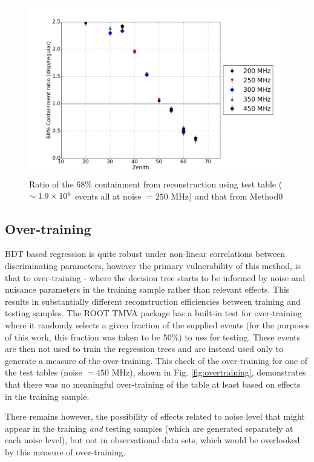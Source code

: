 \documentclass[main.tex]{subfiles}
\begin{document}
\begin{figure}[htbp]
  \centering
  \includegraphics[width=0.8\linewidth]{images/disp_250_ratio_xzen}
  \caption[Test \disp table reconstruction (noise = $250$ MHz)]{Ratio of the 68\% containment from reconstruction using test \disp table ($\sim 1.9\times 10^{6}$ events all at noise $= 250$ MHz) and that from Method0}
  \label{fig:disp_ratio_250}
\end{figure}

\subsection{Over-training}
BDT based regression is quite robust under non-linear correlations between discriminating parameters, however the primary vulnerability of this method, is that  to over-training - where the decision tree starts to be informed by noise and nuisance parameters in the training sample rather than relevant effects. This results in substantially different reconstruction efficiencies between training and testing samples. The ROOT TMVA package has a built-in test for over-training where it randomly selects a given fraction of the supplied events (for the purposes of this work, this fraction was taken to be 50\%) to use for testing. These events are then not used to train the regression trees and are instead used only to generate a measure of the over-training.
This check of the over-training for one of the test tables (noise $= 450$ MHz), shown in Fig. \ref{fig:overtraining}, demonstrates that there was no meaningful over-training of the table at least based on effects in the training sample.

There remains however, the possibility of effects related to noise level that might appear in the training \textit{and} testing samples (which are generated separately at each noise level), but not in observational data sets, which would be overlooked by this measure of over-training.
\end{document}
